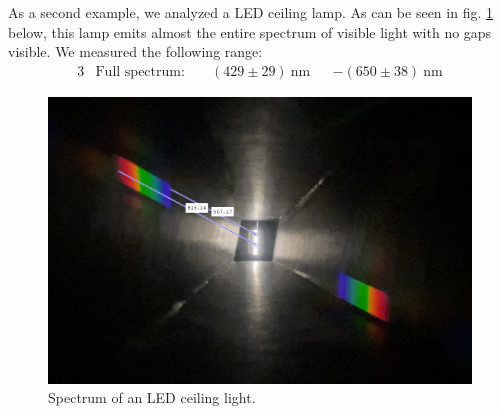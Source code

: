 As a second example, we analyzed a LED ceiling lamp. As can be seen in fig. \ref{fig_lamp2} below, this lamp
emits almost the entire spectrum of visible light with no gaps visible. We measured the following range:
\begin{alignat}{3}
    &\text{Full spectrum:} \; &&(429 \pm 29)~\si{\nano\meter} & &- (650 \pm 38)~\si{\nano\meter} \nonumber
\end{alignat}
\vspace{-2em}
\begin{figure}[H]
    \centering
    \includegraphics[scale = 0.38]{src/images/lamp2_meas.png}
    \caption{Spectrum of an LED ceiling light.}
    \label{fig_lamp2}
\end{figure}

